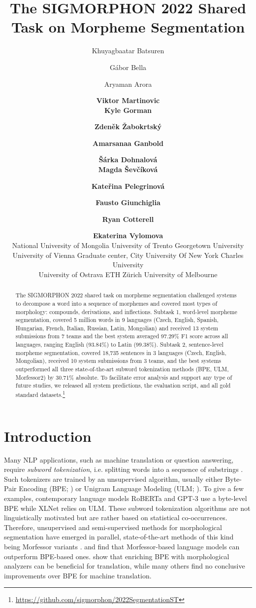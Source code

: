 \documentclass[11pt]{article}
\title{The SIGMORPHON 2022 Shared Task on Morpheme Segmentation}
\author{Khuyagbaatar Batsuren \and G{\'a}bor Bella \and Aryaman Arora \and {\bf Viktor Martinovic} \\ {\bf Kyle Gorman} \and {\bf Zdeněk Žabokrtský} \and {\bf Amarsanaa Ganbold} \and {\bf Šárka Dohnalová} \\ {\bf Magda Ševčíková} \and {\bf Kateřina Pelegrinová} \and {\bf Fausto Giunchiglia} \and {\bf Ryan Cotterell} \\ \and {\bf Ekaterina Vylomova} \\ National University of Mongolia \hspace{.1cm} University of Trento \hspace{.1cm} Georgetown University \\ University of Vienna \hspace{.1cm} Graduate center, City University Of New York \hspace{.1cm} Charles University \\ University of Ostrava \hspace{.1cm} ETH Zürich \hspace{.1cm} University of Melbourne \\ 
}
\begin{document}
\maketitle
\begin{abstract}
The SIGMORPHON 2022 shared task on morpheme segmentation challenged systems to decompose a word into a sequence of morphemes and covered most types of morphology: compounds, derivations, and inflections. Subtask 1, word-level morpheme segmentation, covered 5 million words in 9 languages (Czech, English, Spanish, Hungarian, French, Italian, Russian, Latin, Mongolian) and received 13 system submissions from 7 teams and the best system averaged 97.29\% F1 score across all languages, ranging English (93.84\%) to Latin (99.38\%). Subtask 2, sentence-level morpheme segmentation, covered 18,735 sentences in 3 languages (Czech, English, Mongolian), received 10 system submissions from 3 teams, and the best systems outperformed all three state-of-the-art subword tokenization methods (BPE, ULM, Morfessor2) by 30.71\% absolute.
To facilitate error analysis and support any type of future studies, we released all system predictions, the evaluation script, and all gold standard datasets.\footnote{\url{https://github.com/sigmorphon/2022SegmentationST}}

\end{abstract}

\section{Introduction}
Many NLP applications, such as machine translation or question answering, require \emph{subword tokenization}, i.e. splitting words into a sequence of substrings \cite{mielke2021between}. Such tokenizers are trained by an unsupervised algorithm, usually either Byte-Pair Encoding (BPE; \citealt{gage1994new,sennrich2016neural}) or Unigram Language Modeling (ULM; \citealt{kudo-2018-subword}). To give a few examples, contemporary language models RoBERTa \cite{liu2019roberta} and GPT-3 \cite{brown2020language} use a byte-level BPE \cite{radford2019language} while XLNet \cite{yang2019xlnet} relies on ULM. These subword tokenization algorithms are not linguistically motivated but are rather based on statistical co-occurrences. Therefore, unsupervised and semi-supervised methods for morphological segmentation \cite{creutz2005unsupervised} have emerged in parallel, state-of-the-art methods of this kind being Morfessor variants \cite{gronroos2014morfessor,gronroos2020morfessor}. \citet{ataman2017linguistically} and \citet{schwartz2020neural} find that Morfessor-based language models can outperform BPE-based ones. \citet{matthews2018using,nzeyimana2022kinyabert} show that enriching BPE with morphological analyzers can be beneficial for translation, while many others \cite{domingo2018much,machavcek2018morphological,schwartz2020neural,saleva-lignos-2021-effectiveness} find no conclusive improvements over BPE for machine translation. 
\end{document}
